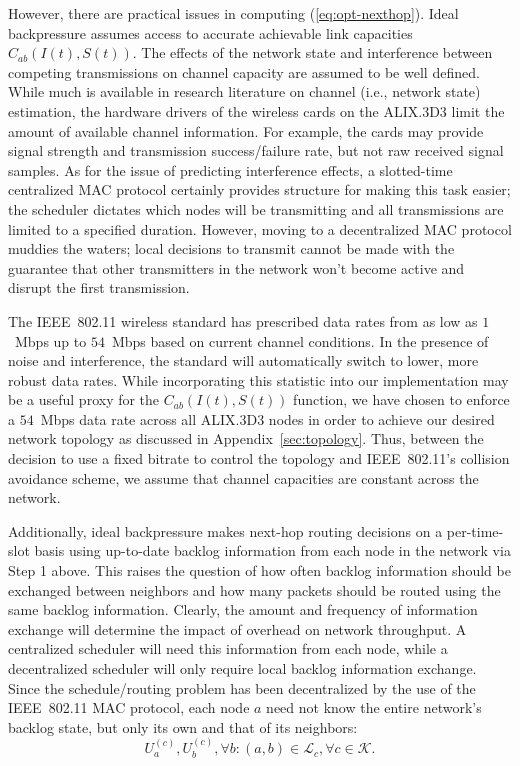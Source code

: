 \documentclass{article}
\begin{document}
However, there are practical issues in computing (\ref{eq:opt-nexthop}).
Ideal backpressure assumes access to accurate achievable link capacities \(C_{ab}(I(t),S(t))\).
The effects of the network state and interference between competing transmissions on channel capacity are assumed to be well defined.
While much is available in research literature on channel (i.e., network state) estimation, the hardware drivers of the wireless cards on the ALIX.3D3 limit the amount of available channel information.
For example, the cards may provide signal strength and transmission success/failure rate, but not raw received signal samples.
As for the issue of predicting interference effects, a slotted-time centralized MAC protocol certainly provides structure for making this task easier; the scheduler dictates which nodes will be transmitting and all transmissions are limited to a specified duration.
However, moving to a decentralized MAC protocol muddies the waters; local decisions to transmit cannot be made with the guarantee that other transmitters in the network won't become active and disrupt the first transmission.


The IEEE~802.11 wireless standard has prescribed data rates from as low as \(1\)~Mbps up to \(54\)~Mbps based on current channel conditions.
In the presence of noise and interference, the standard will automatically switch to lower, more robust data rates.
While incorporating this statistic into our implementation may be a useful proxy for the \(C_{ab}(I(t),S(t))\) function, we have chosen to enforce a \(54\)~Mbps data rate across all ALIX.3D3 nodes in order to achieve our desired network topology as discussed in Appendix~\ref{sec:topology}.
Thus, between the decision to use a fixed bitrate to control the topology and IEEE~802.11's collision avoidance scheme, we assume that channel capacities are constant across the network.


Additionally, ideal backpressure makes next-hop routing decisions on a per-time-slot basis using up-to-date backlog information from each node in the network via Step 1 above.
This raises the question of how often backlog information should be exchanged between neighbors and how many packets should be routed using the same backlog information.
Clearly, the amount and frequency of information exchange will determine the impact of overhead on network throughput.
A centralized scheduler will need this information from each node, while a decentralized scheduler will only require local backlog information exchange.
Since the schedule/routing problem has been decentralized by the use of the IEEE~802.11 MAC protocol, each node \(a\) need not know the entire network's backlog state, but only its own and that of its neighbors:
%
\begin{equation}
  U_{a}^{(c)}, U_{b}^{(c)}, \forall b:(a,b)\in\mathcal{L}_c, \forall c \in \mathcal{K}.
\end{equation}
\end{document}
